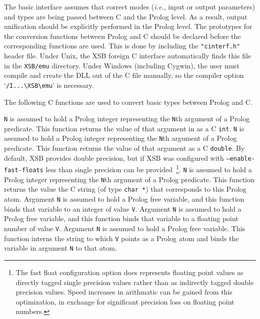 The basic interface assumes that correct modes ({\it i.e.}, input or
output parameters) and types are being passed between C and the Prolog
level.  As a result, output unification should be explicitly performed
in the Prolog level.  The prototypes for the conversion functions
between Prolog and C should be declared before the corresponding
functions are used.  This is done by including the {\tt "cinterf.h"}
header file.  Under Unix, the XSB foreign C interface automatically
finds this file in the {\tt XSB/emu} directory. Under Windows
(including Cygwin), the user must compile and create the DLL out of
the C file manually, so the compiler option `\verb|/I...\XSB\emu|' is
necessary.

The following C functions are used to convert basic types between
Prolog and C.
\begin{description}
 {\tt N} is assumed to hold a Prolog
integer representing the {\tt N}th argument of a Prolog predicate.
This function returns the value of that argument in as a C {\tt int}.
%
 {\tt N} is assumed to hold a Prolog
integer representing the {\tt N}th argument of a Prolog predicate.
This function returns the value of that argument as a C {\tt double}.
By default, XSB provides double precision, but if XSB was configured
with {\tt --enable-fast-floats} less than single precision can be
provided~\footnote{The fast float configuration option does represents
  floating point values as directly tagged single precision values
  rather than as indirectly tagged double precision values. Speed
  increases in arithmatic can be gained from this optimization, in
  exchange for significant precision loss on floating point numbers.}.
%
 {\tt N} is assumed to hold a Prolog
integer representing the {\tt N}th argument of a Prolog predicate.
This function returns the value the C string (of type {\tt char *})
that corresponds to this Prolog atom.
%
 Argument {\tt N} is assumed to
hold a Prolog free variable, and this function binds that variable to
an integer of value {\tt V}.
%
 Argument {\tt N} is assumed to
hold a Prolog free variable, and this function binds that variable to
a floating point number of value {\tt V}.  
%
 Argument {\tt N} is
assumed to hold a Prolog free variable.  This function interns the
string to which {\tt V} points as a Prolog atom and binds the variable
in argument {\tt N} to that atom.
\end{description}


